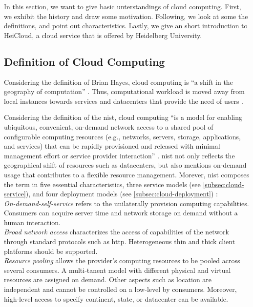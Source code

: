 In this section, we want to give basic unterstandings of cloud computing. First, we exhibit the history and draw some motivation. Following, we look at some the definitions, and point out characteristics. Lastly, we give an short introduction to HeiCloud, a cloud service that is offered by Heidelberg University.

\subsection{Definition of Cloud Computing}

Considering the definition of Brian Hayes, cloud computing is \enquote{a shift in the geography of computation} \cite{hayes2008}. Thus, computational workload is moved away from local instances towards services and datacenters that provide the need of users \cite{Armbrust2010}.

Considering the definition of the \ac{nist}, cloud computing \enquote{is a model for enabling ubiquitous, convenient, on-demand network access to a shared pool of configurable computing resources (e.g., networks, servers, storage, applications, and services) that can be rapidly provisioned and released with minimal management effort or service provider interaction} \cite{Mell2011}. \ac{nist} not only reflects the geographical shift of resources such as datacenters, but also mentions on-demand usage that contributes to a flexible resource management. Morever, \ac{nist} composes the term in five essential characteristics, three service models (see \autoref{subsec:cloud-service}), and four deployment models (see \autoref{subsec:cloud-deployment}) \cite{Mell2011}:\\

\textit{On-demand-self-service} refers to the unilaterally provision computing capabilities. Consumers can acquire server time and network storage on demand without a human interaction.\\

\textit{Broad network access} characterizes the access of capabilities of the network through standard protocols such as \ac{http}. Heterogeneous thin and thick client platforms should be supported.\\

\textit{Resource pooling} allows the provider's computing resources to be pooled across several consumers. A multi-tanent model with different physical and virtual resources are assigned on demand. Other aspects such as location are independent and cannot be controlled on a low-level by consumers. Moreover, high-level access to specify continent, state, or datacenter can be available.\\

